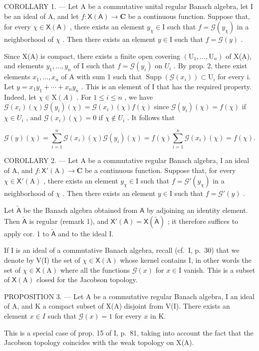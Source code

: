 COROLLARY 1. --- Let A be a commutative unital regular Banach algebra, let I be an ideal of A, and let \(f: \mathsf{X}(\mathsf{A}) \to \mathbf{C}\) be a continuous function. Suppose that, for every \(\chi \in \mathsf{X}(\mathsf{A})\) , there exists an element \(y_{\chi} \in \mathrm{I}\) such that \(f = \mathcal{G}(y_{\chi})\) in a neighborhood of \(\chi\) . Then there exists an element \(y \in \mathrm{I}\) such that \(f = \mathcal{G}(y)\) .

Since X(A) is compact, there exists a finite open covering \((\mathrm{U}_{1},\ldots,\mathrm{U}_{n})\) of X(A), and elements \(y_{1},\ldots,y_{n}\) of I such that \(f=\mathcal{G}(y_{i})\) on \(U_{i}\) . By prop. 2, there exist elements \(x_{1},\ldots,x_{n}\) of A with sum 1 such that \(\operatorname{Supp}(\mathcal{G}(x_{i}))\subset\mathrm{U}_{i}\) for every i. Let \(y=x_{1}y_{1}+\cdots+x_{n}y_{n}\) . This is an element of I that has the required property. Indeed, let \(\chi\in\mathrm{X}(A)\) . For \(1\leqslant i\leqslant n\) , we have \(\mathcal{G}(x_{i})(\chi)\mathcal{G}(y_{i})(\chi)=\mathcal{G}(x_{i})(\chi)f(\chi)\) since \(\mathcal{G}(y_{i})(\chi)=f(\chi)\) if \(\chi\in U_{i}\) , and \(\mathcal{G}(x_{i})(\chi)=0\) if \(\chi\notin U_{i}\) . It follows that

\[
\mathcal {G} (y) (\chi) = \sum_ {i = 1} ^ {n} \mathcal {G} (x _ {i}) (\chi) \mathcal {G} (y _ {i}) (\chi) = f (\chi) \sum_ {i = 1} ^ {n} \mathcal {G} (x _ {i}) (\chi) = f (\chi).
\]

COROLLARY 2. --- Let A be a commutative regular Banach algebra, I an ideal of A, and \(f\colon\mathsf{X}'(\mathrm{A})\to\mathbf{C}\) be a continuous function. Suppose that, for every \(\chi\in\mathsf{X}'(\mathrm{A})\) , there exists an element \(y_{\chi}\in\mathrm{I}\) such that \(f=\mathcal{G}'(y_{\chi})\) in a neighborhood of \(\chi\) . Then there exists an element \(y\in\mathrm{I}\) such that \(f=\mathcal{G}'(y)\) .

Let \(\tilde{\mathsf{A}}\) be the Banach algebra obtained from \(\mathsf{A}\) by adjoining an identity element. Then \(\tilde{\mathsf{A}}\) is regular (remark 1), and \(\mathsf{X}'(\mathsf{A}) = \mathsf{X}(\widetilde{\mathsf{A}})\) ; it therefore suffices to apply cor. 1 to \(\tilde{\mathsf{A}}\) and to the ideal I.

If I is an ideal of a commutative Banach algebra, recall (cf.~I, p.~30) that we denote by V(I) the set of \(\chi \in \mathsf{X}(\mathrm{A})\) whose kernel contains I, in other words the set of \(\chi \in \mathsf{X}(\mathrm{A})\) where all the functions \(\mathcal{G}(x)\) for \(x \in \mathrm{I}\) vanish. This is a subset of \(\mathsf{X}(\mathrm{A})\) closed for the Jacobson topology.

PROPOSITION 3. --- Let A be a commutative regular Banach algebra, I an ideal of A, and K a compact subset of X(A) disjoint from V(I). There exists an element \(x \in I\) such that \(\mathcal{G}(x) = 1\) for every \(x\) in K.

This is a special case of prop. 15 of I, p.~81, taking into account the fact that the Jacobson topology coincides with the weak topology on X(A).
\relax{}
